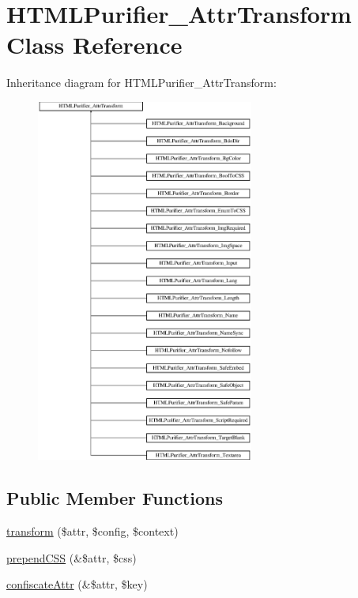 \hypertarget{classHTMLPurifier__AttrTransform}{\section{H\+T\+M\+L\+Purifier\+\_\+\+Attr\+Transform Class Reference}
\label{classHTMLPurifier__AttrTransform}
}
Inheritance diagram for H\+T\+M\+L\+Purifier\+\_\+\+Attr\+Transform\+:\begin{figure}[H]
\begin{center}
\leavevmode
\includegraphics[height=12.000000cm]{classHTMLPurifier__AttrTransform}
\end{center}
\end{figure}
\subsection*{Public Member Functions}
\begin{DoxyCompactItemize}
\item 
\hyperlink{classHTMLPurifier__AttrTransform_a2812e8ea8d30920b86e68c57d8be8dc0}{transform} (\$attr, \$config, \$context)
\item 
\hyperlink{classHTMLPurifier__AttrTransform_af0cc1bd83887a96c1cd756824fea81e1}{prepend\+C\+S\+S} (\&\$attr, \$css)
\item 
\hyperlink{classHTMLPurifier__AttrTransform_ac21852d026a715c2c371cfb8b5d6901c}{confiscate\+Attr} (\&\$attr, \$key)
\end{DoxyCompactItemize}


